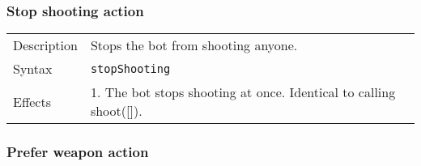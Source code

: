 \documentclass[11pt,a4paper]{article}
\begin{document}
\subsubsection*{Stop shooting action}
\begin{small}
\begin{tabular}{p{2cm}p{9cm}}
Description & Stops the bot from shooting anyone.\\
Syntax & \verb|stopShooting| \\

Effects & 
	1.	The bot stops shooting at once. Identical to calling shoot([]).\\
\end{tabular}
\end{small}


\subsubsection*{Prefer weapon action}
\end{document}
